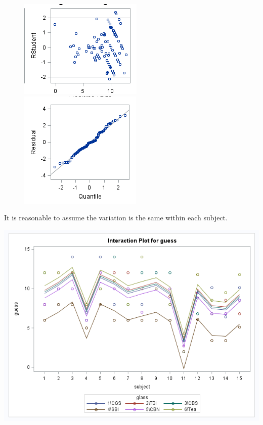 \documentclass{article}\usepackage[]{graphicx}\usepackage[]{color}
\begin{document}
\begin{enumerate}
\begin{enumerate}
\begin{figure}
\centering
\begin{minipage}{.5\textwidth}
  \centering
  \includegraphics[width=.6\linewidth]{glasshov}
  \end{minipage}%
\begin{minipage}{.5\textwidth}
  \centering
  \includegraphics[width=.6\linewidth]{glassnorm}
\end{minipage}
\end{figure}

It is reasonable to assume the variation is the same within each subject.

\includegraphics{level2}


\end{enumerate}
\end{enumerate}
\end{document}
